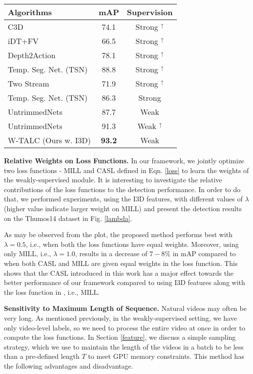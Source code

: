 \documentclass[runningheads]{llncs}
\begin{document}
\begin{table}[t!]
\begin{minipage}{0.48\textwidth}
\begin{tabular}{l | c | c}
			\hline
			{Algorithms} & {mAP} & {Supervision} \\
			\hline \hline
			{C3D \cite{tran2015learning}} & {74.1} & {Strong $^\uparrow$}\\
{iDT+FV \cite{wang2013action}} & {66.5} & {Strong $^\uparrow$}\\
{Depth2Action \cite{jain201515}} & {78.1} & {Strong $^\uparrow$}\\
{Temp. Seg. Net. (TSN) \cite{wang2016temporal}} & {88.8} & {Strong $^\uparrow$}\\
{Two Stream  \cite{simonyan2014two}} & {71.9} & {Strong $^\uparrow$}\\
{Temp. Seg. Net. (TSN) \cite{wang2016temporal}} & {86.3} & {Strong}\\		
			\hline
			\hline
			{UntrimmedNets \cite{wang2017untrimmednets}} & {87.7} & {Weak}\\
{UntrimmedNets \cite{wang2017untrimmednets}} & {91.3} & {Weak $^\uparrow$}\\
{W-TALC (Ours w. I3D)} & {\textbf{93.2}} & {Weak}\\
			\hline
			\hline
		\end{tabular}
		\label{activitynet_classification}
	\end{minipage}
\end{table}

\textbf{Relative Weights on Loss Functions.} In our framework, we jointly optimize two loss functions - MILL and CASL defined in Eqn. \ref{loss} to learn the weights of the weakly-supervised module. It is interesting to investigate the relative contributions of the loss functions to the detection performance. In order to do that, we performed experiments, using the I3D features, with different values of $\lambda$ (higher value indicate larger weight on MILL) and present the detection results on the Thumos14 dataset in Fig. \ref{lambda}. 

As may be observed from the plot, the proposed method performs best with $\lambda=0.5$, i.e., when both the loss functions have equal weights. Moreover, using only MILL, i.e., $\lambda=1.0$, results in a decrease of $7-8\%$ in mAP compared to when both CASL and MILL are given equal weights in the loss function. This shows that the CASL introduced in this work has a major effect towards the better performance of our framework compared to using I3D features along with the loss function in \cite{wang2017untrimmednets}, i.e., MILL.

\textbf{Sensitivity to Maximum Length of Sequence.}
Natural videos may often be very long. As mentioned previously, in the weakly-supervised setting, we have only video-level labels, so we need to process the entire video at once in order to compute the loss functions. In Section \ref{feature}, we discuss a simple sampling strategy, which we use to maintain the length of the videos in a batch to be less than a pre-defined length $T$ to meet GPU memory constraints. This method has the following advantages and disadvantage. 
\end{document}
